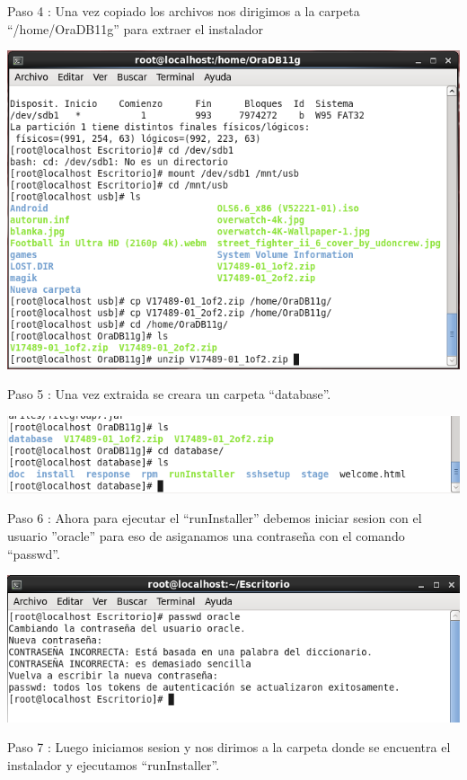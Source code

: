 \documentclass[a4paper,openright,12pt]{book}
\begin{document}
Paso 4 : Una vez copiado los archivos nos dirigimos a la carpeta “/home/OraDB11g”  para extraer el instalador
\begin{center}
\includegraphics[width=15cm]{./oracle linux/7.png}
\end{center}
Paso 5 : Una vez extraida se creara un carpeta “database”.

\begin{center}
\includegraphics[width=15cm]{./oracle linux/8.png}
\end{center}
Paso 6 : Ahora para ejecutar el “runInstaller” debemos iniciar sesion con el usuario ”oracle” para eso de asiganamos una contraseña con el comando “passwd”.
\begin{center}
\includegraphics[width=15cm]{./oracle linux/9.png}
\end{center}

Paso 7 : Luego iniciamos sesion y nos dirimos a la carpeta donde se encuentra el instalador y ejecutamos “runInstaller”.
\end{document}
